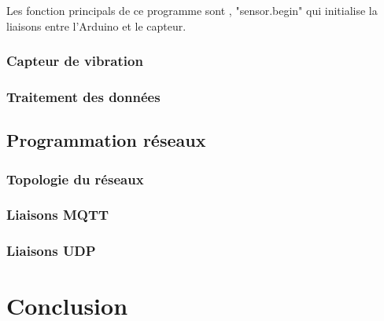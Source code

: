 \documentclass[11pt,french,a4paper]{article}
\begin{document}
Les fonction principals de ce programme sont , "sensor.begin" qui initialise la liaisons entre l'Arduino et le capteur.
\subsubsection{Capteur de vibration}
\subsubsection{Traitement des données}
\subsection{Programmation réseaux}
\subsubsection{Topologie du réseaux}
\subsubsection{Liaisons MQTT}
\subsubsection{Liaisons UDP}
\section{Conclusion}

\newpage
\listoffigures
\end{document}
